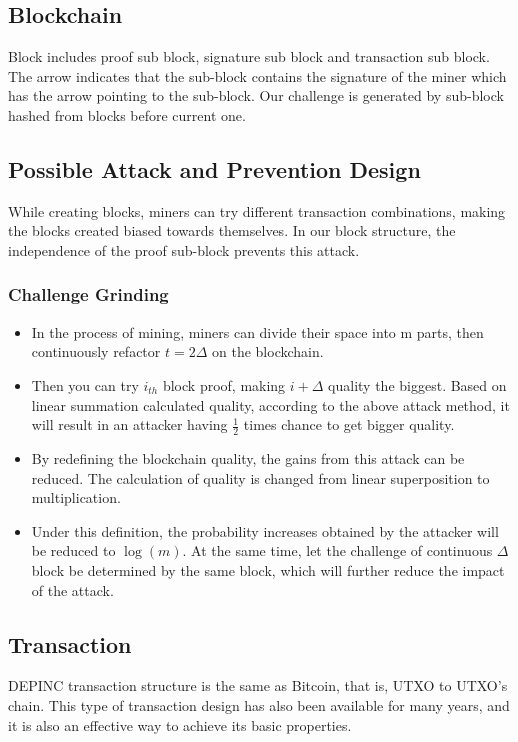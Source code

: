 \subsection{Blockchain}
\begin{flushleft}
    Block includes proof sub block, signature sub block and transaction sub block. The arrow indicates that the sub-block contains the signature of the miner which has the arrow pointing to the sub-block. Our challenge is generated by sub-block hashed from blocks before current one.
\end{flushleft}
\subsection{Possible Attack and Prevention Design}
\begin{flushleft}
    While creating blocks, miners can try different transaction combinations, making the blocks created biased towards themselves. In our block structure, the independence of the proof sub-block prevents this attack.
\end{flushleft}
\subsubsection{Challenge Grinding}
\begin{itemize}
    \item In the process of mining, miners can divide their space into m parts, then continuously refactor $t = 2\Delta$ on the blockchain.
    \item Then you can try $i_{th}$ block proof, making $i + \Delta$ quality the biggest. Based on linear summation calculated quality, according to the above attack method, it will result in an attacker having $\frac{1}{2}$ times chance to get bigger quality.
    \item By redefining the blockchain quality, the gains from this attack can be reduced. The calculation of quality is changed from linear superposition to multiplication.
    \item Under this definition, the probability increases obtained by the attacker will be reduced to $\log(m)$. At the same time, let the challenge of continuous $\Delta$ block be determined by the same block, which will further reduce the impact of the attack.
\end{itemize}
\subsection{Transaction}
\begin{flushleft}
    DEPINC transaction structure is the same as Bitcoin, that is, UTXO to UTXO's chain. This type of transaction design has also been available for many years, and it is also an effective way to achieve its basic properties.
\end{flushleft}

